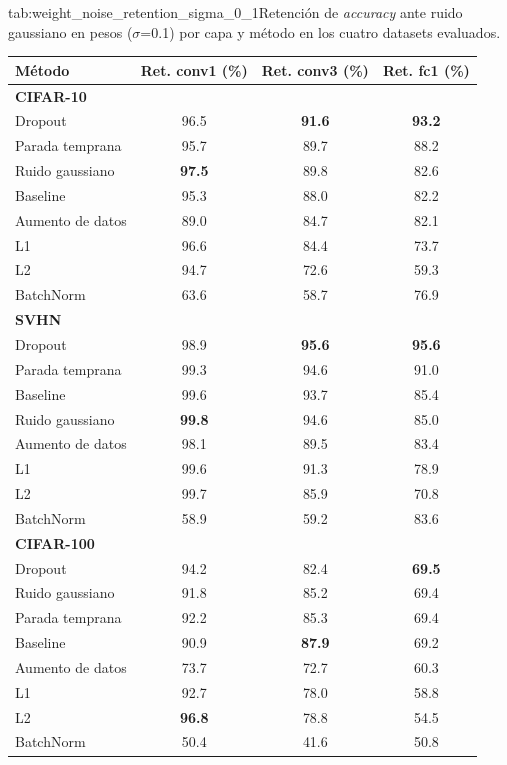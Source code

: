 \begin{table}{tab:weight_noise_retention_sigma_0_1}{Retención de \textit{accuracy} ante ruido gaussiano en pesos ($\sigma$=0.1) por capa y método en los cuatro datasets evaluados.}
\small
\begin{tabular}{lccc}
\toprule
\textbf{Método} & \textbf{Ret. conv1 (\%)} & \textbf{Ret. conv3 (\%)} & \textbf{Ret. fc1 (\%)} \\
\midrule
\multicolumn{4}{l}{\textbf{CIFAR-10}}\\
\midrule
Dropout & 96.5 & \textbf{91.6} & \textbf{93.2} \\
Parada temprana & 95.7 & 89.7 & 88.2 \\
Ruido gaussiano & \textbf{97.5} & 89.8 & 82.6 \\
Baseline & 95.3 & 88.0 & 82.2 \\
Aumento de datos & 89.0 & 84.7 & 82.1 \\
L1 & 96.6 & 84.4 & 73.7 \\
L2 & 94.7 & 72.6 & 59.3 \\
BatchNorm & 63.6 & 58.7 & 76.9 \\
\midrule
\multicolumn{4}{l}{\textbf{SVHN}}\\
\midrule
Dropout & 98.9 & \textbf{95.6} & \textbf{95.6} \\
Parada temprana & 99.3 & 94.6 & 91.0 \\
Baseline & 99.6 & 93.7 & 85.4 \\
Ruido gaussiano & \textbf{99.8} & 94.6 & 85.0 \\
Aumento de datos & 98.1 & 89.5 & 83.4 \\
L1 & 99.6 & 91.3 & 78.9 \\
L2 & 99.7 & 85.9 & 70.8 \\
BatchNorm & 58.9 & 59.2 & 83.6 \\
\midrule
\multicolumn{4}{l}{\textbf{CIFAR-100}}\\
\midrule
Dropout & 94.2 & 82.4 & \textbf{69.5} \\
Ruido gaussiano & 91.8 & 85.2 & 69.4 \\
Parada temprana & 92.2 & 85.3 & 69.4 \\
Baseline & 90.9 & \textbf{87.9} & 69.2 \\
Aumento de datos & 73.7 & 72.7 & 60.3 \\
L1 & 92.7 & 78.0 & 58.8 \\
L2 & \textbf{96.8} & 78.8 & 54.5 \\
BatchNorm & 50.4 & 41.6 & 50.8 \\
\midrule

\end{tabular}
\end{table}
